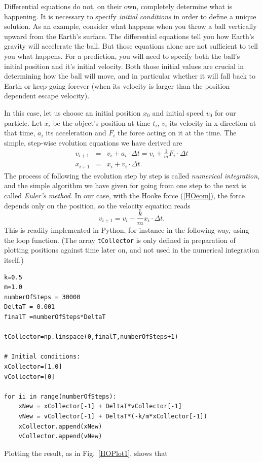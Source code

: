 \documentclass[twocolumn,apj]{openjournal}
\newcommand{\be}{\begin{equation}}
\newcommand{\ee}{\end{equation}}
\newcommand{\bea}{\begin{eqnarray}}
\newcommand{\eea}{\end{eqnarray}}
\begin{document}
Differential equations do not, on their own, completely determine what is happening. It is necessary to specify {\em initial conditions} in order to define a unique solution. As an example, consider what happens when you throw a ball vertically upward from the Earth's surface. The differential equations tell you how Earth's gravity will accelerate the ball. But those equations alone are not sufficient to tell you what happens. For a prediction, you will need to specify both the ball's initial position and it's initial velocity. Both those initial values are crucial in determining how the ball will move, and in particular whether it will fall back to Earth or keep going forever (when its velocity is larger than the position-dependent escape velocity).

In this case, let us choose an initial position $x_0$ and initial speed $v_0$ for our particle. Let $x_i$ be the object's position at time $t_i$, $v_i$ its velocity in x direction at that time, $a_i$ its acceleration and $F_i$ the force acting on it at the time. The simple, step-wise evolution equations we have derived are 
\bea
v_{i+1} &=& v_i + a_i\cdot\Delta t = v_i + \frac{1}{m}F_i\cdot\Delta t\\[0.5em]
x_{i+1} &=& x_i + v_i\cdot\Delta t.
\eea
The process of following the evolution step by step is called {\em numerical integration}, and the simple algorithm we have given for going from one step to the next is called {\em Euler's method}. In our case, with the Hooke force (\ref{HOeom}), the force depends only on the position, so the velocity equation reads
\be
v_{ i+1}= v_i  -\frac{k}{m}x_i\cdot\Delta t.
\ee
This is readily implemented in Python, for instance in the following way, using the loop function. (The array \verb|tCollector| is only defined in preparation of plotting positions against time later on, and not used in the numerical integration itself.)
\begin{lstlisting}
k=0.5
m=1.0
numberOfSteps = 30000
DeltaT = 0.001
finalT =numberOfSteps*DeltaT

tCollector=np.linspace(0,finalT,numberOfSteps+1)

# Initial conditions:
xCollector=[1.0]
vCollector=[0]

for ii in range(numberOfSteps):
    xNew = xCollector[-1] + DeltaT*vCollector[-1]
    vNew = vCollector[-1] + DeltaT*(-k/m*xCollector[-1])
    xCollector.append(xNew)
    vCollector.append(vNew)
\end{lstlisting}
Plotting the result, as in Fig.~\ref{HOPlot1}, shows that 
\end{document}
